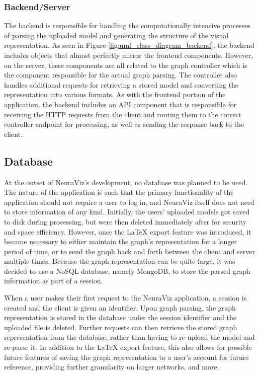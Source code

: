 \subsubsection{Backend/Server}
The backend is responsible for handling the computationally intensive processes of parsing the uploaded model and generating the structure of the visual representation. As seen in Figure \ref{fig:uml_class_diagram_backend}, the backend includes objects that almost perfectly mirror the frontend components. However, on the server, these components are all related to the graph controller which is the component responsible for the actual graph parsing. The controller also handles additional requests for retrieving a stored model and converting the representation into various formats. As with the frontend portion of the application, the backend includes an API component that is responsible for receiving the HTTP requests from the client and routing them to the correct controller endpoint for processing, as well as sending the response back to the client.

\subsection{Database}
At the outset of NeuraViz's development, no database was planned to be used. The nature of the application is such that the primary functionality of the application should not require a user to log in, and NeuraViz itself does not need to store information of any kind. Initially, the users' uploaded models got saved to disk during processing, but were then deleted immediately after for security and space efficiency. However, once the \LaTeX{} export feature was introduced, it became necessary to either maintain the graph's representation for a longer period of time, or to send the graph back and forth between the client and server multiple times. Because the graph representation can be quite large, it was decided to use a NoSQL database, namely MongoDB, to store the parsed graph information as part of a session.

When a user makes their first request to the NeuraViz application, a session is created and the client is given an identifier. Upon graph parsing, the graph representation is stored in the database under the session identifier and the uploaded file is deleted. Further requests can then retrieve the stored graph representation from the database, rather than having to re-upload the model and re-parse it. In addition to the \LaTeX{} export feature, this also allows for possible future features of saving the graph representation to a user's account for future reference, providing further granularity on larger networks, and more.

